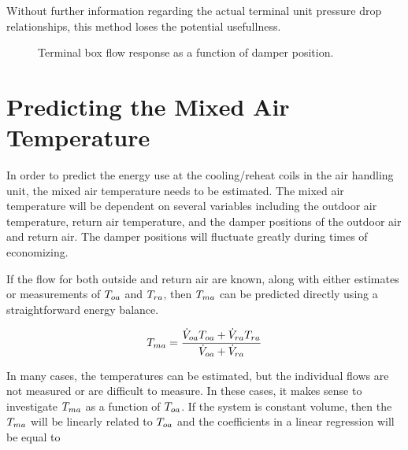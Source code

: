 Without further information regarding the actual terminal unit pressure drop relationships, this method loses the potential usefullness.  


\begin{figure}
\centering
{}
\caption{Terminal box flow response as a function of damper position.}
\label{fig:flowVersusDamperPos}
\end{figure}


\section{Predicting the Mixed Air Temperature}

In order to predict the energy use at the cooling/reheat coils in the air handling unit, the mixed air temperature needs to be estimated. The mixed air temperature will be dependent on several variables including the outdoor air temperature, return air temperature, and the damper positions of the outdoor air and return air. The damper positions will fluctuate greatly during times of economizing.  

If the flow for both outside and return air are known, along with either estimates or measurements of \(T_{oa}{}\) and \(T_{ra}{}\), then \(T_{ma}{}\) can be predicted directly using a straightforward energy balance. 

\begin{equation}
    T_{ma}{} = \frac{\dot{V}_{oa} T_{oa}{} + \dot{V}_{ra} T_{ra}{}}{\dot{V}_{oa}+\dot{V}_{ra}}
\end{equation}

In many cases, the temperatures can be estimated, but the individual flows are not measured or are difficult to measure. In these cases, it makes sense to investigate \(T_{ma}{}\) as a function of \(T_{oa}{}\). If the system is constant volume, then the \(T_{ma}\) will be linearly related to \(T_{oa}\) and the coefficients in a linear regression will be equal to

